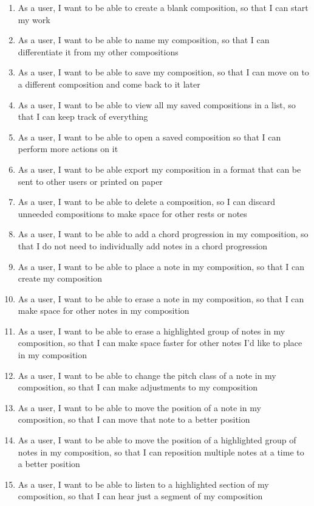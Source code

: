 \begin{enumerate}
\item As a user, I want to be able to create a blank composition, so that I can start my work
\item As a user, I want to be able to name my composition, so that I can differentiate it from my other compositions
\item As a user, I want to be able to save my composition, so that I can move on to a different composition and come back to it later
\item As a user, I want to be able to view all my saved compositions in a list, so that I can keep track of everything
\item As a user, I want to be able to open a saved composition so that I can perform more actions on it
\item As a user, I want to be able export my composition in a format that can be sent to other users or printed on paper
\item As a user, I want to be able to delete a composition, so I can discard unneeded compositions to make space for other rests or notes
\item As a user, I want to be able to add a chord progression in my composition, so that I do not need to individually add notes in a chord progression
\item As a user, I want to be able to place a note in my composition, so that I can create my composition
\item As a user, I want to be able to erase a note in my composition, so that I can make space for other notes in my composition
\item As a user, I want to be able to erase a highlighted group of notes in my composition, so that I can make space faster for other notes I'd like to place in my composition
\item As a user, I want to be able to change the pitch class of a note in my composition, so that I can make adjustments to my composition
\item As a user, I want to be able to move the position of a note in my composition, so that I can move that note to a better position
\item As a user, I want to be able to move the position of a highlighted group of notes in my composition, so that I can reposition multiple notes at a time to a better position
\item As a user, I want to be able to listen to a highlighted section of my composition, so that I can hear just a segment of my composition

\end{enumerate}
